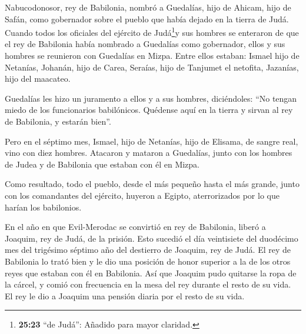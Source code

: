  Nabucodonosor, rey de Babilonia, nombró a Guedalías, hijo
de Ahicam, hijo de Safán, como gobernador sobre el pueblo que había
dejado en la tierra de Judá.  Cuando todos los oficiales
del ejército de Judá\footnote{\textbf{25:23} ``de Judá'': Añadido para
  mayor claridad.}y sus hombres se enteraron de que el rey de Babilonia
había nombrado a Guedalías como gobernador, ellos y sus hombres se
reunieron con Guedalías en Mizpa. Entre ellos estaban: Ismael hijo de
Netanías, Johanán, hijo de Carea, Seraías, hijo de Tanjumet el netofita,
Jazanías, hijo del maacateo.

 Guedalías les hizo un juramento a ellos y a sus hombres,
diciéndoles: ``No tengan miedo de los funcionarios babilónicos. Quédense
aquí en la tierra y sirvan al rey de Babilonia, y estarán bien''.

 Pero en el séptimo mes, Ismael, hijo de Netanías, hijo de
Elisama, de sangre real, vino con diez hombres. Atacaron y mataron a
Guedalías, junto con los hombres de Judea y de Babilonia que estaban con
él en Mizpa.

 Como resultado, todo el pueblo, desde el más pequeño hasta
el más grande, junto con los comandantes del ejército, huyeron a Egipto,
aterrorizados por lo que harían los babilonios.

 En el año en que Evil-Merodac se convirtió en rey de
Babilonia, liberó a Joaquim, rey de Judá, de la prisión. Esto sucedió el
día veintisiete del duodécimo mes del trigésimo séptimo año del
destierro de Joaquim, rey de Judá.  El rey de Babilonia lo
trató bien y le dio una posición de honor superior a la de los otros
reyes que estaban con él en Babilonia.  Así que Joaquim
pudo quitarse la ropa de la cárcel, y comió con frecuencia en la mesa
del rey durante el resto de su vida.  El rey le dio a
Joaquim una pensión diaria por el resto de su vida.
